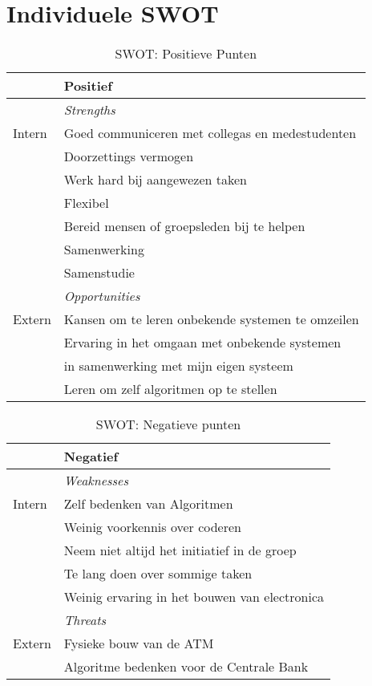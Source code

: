 \documentclass{article}
\begin{document}
\newpage

\section{Individuele SWOT}
\begin{table}[h!]
\caption{SWOT: Positieve Punten}
\label{tab: Positief}
\begin{tabular}{|l|l|}
	& \textbf{Positief}\\
	\hline
			& \textit{Strengths}\\
	{Intern}	& Goed communiceren met collegas en medestudenten \\
			& Doorzettings vermogen	\\
			& Werk hard bij aangewezen taken \\
			& Flexibel \\
			& Bereid mensen of groepsleden bij te helpen \\
			& Samenwerking \\
			& Samenstudie \\
	\hline
			& \textit{Opportunities}\\
	{Extern}	& Kansen om te leren onbekende systemen te omzeilen \\
			& Ervaring in het omgaan met onbekende systemen \\
			& in samenwerking met mijn eigen systeem \\
			& Leren om zelf algoritmen op te stellen \\
\end{tabular}
\end{table}

\begin{table}[h!]
\caption{SWOT: Negatieve punten}
\label{tab: Negatief}
\begin{tabular}{|l|l|}
	& \textbf{Negatief}\\
	\hline
			& \textit{Weaknesses}\\
	{Intern}	& Zelf bedenken van Algoritmen \\
			& Weinig voorkennis over coderen \\
			& Neem niet altijd het initiatief in de groep \\
			& Te lang doen over sommige taken \\
			& Weinig ervaring in het bouwen van electronica \\
	\hline
			& \textit{Threats}\\
	{Extern}	& Fysieke bouw van de ATM \\
			& Algoritme bedenken voor de Centrale Bank \\
\end{tabular}
\end{table}
\end{document}
